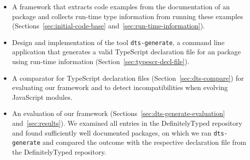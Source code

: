 \documentclass[sigconf]{acmart}
\begin{document}
\begin{itemize}
\item A framework that extracts code examples from the
  documentation of an \NPM{} package and collects run-time type
  information from running these examples (Sections~\ref{sec:initial-code-base}
  and~\ref{sec:run-time-information}). 

\item Design and implementation of the tool \texttt{dts-generate}, a command line
  application that generates a valid TypeScript declaration file for
  an \NPM{} package using run-time information
  (Section~\ref{sec:typescr-decl-file}). 

\item A comparator for TypeScript declaration files
  (Section~\ref{sec:dts-compare}) for evaluating our framework and to
  detect   incompatibilities when evolving JavaScript modules.
\item An evaluation of our framework (Sections~\ref{sec:dts-generate-evaluation}
  and~\ref{sec:results}). We examined all \CountTotalModulesDefinitelyTyped{} entries in 
  the DefinitelyTyped repository and found \CountModulesGeneratedDeclarationFile{} sufficiently
  well documented \NPM{} packages, on which we ran \texttt{dts-generate}
  and compared the outcome with the respective declaration file from the
  DefinitelyTyped repository. 
\end{itemize}
\end{document}

